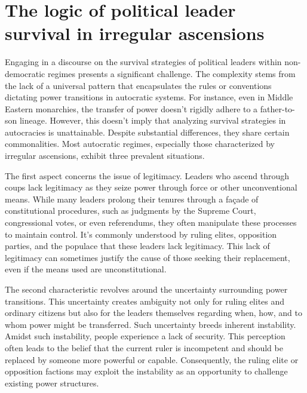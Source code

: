 \documentclass[
  12pt,
  a4paper,
  12pt]{article}
\begin{document}
\hypertarget{the-logic-of-political-leader-survival-in-irregular-ascensions}{%
\section{The logic of political leader survival in irregular
ascensions}\label{the-logic-of-political-leader-survival-in-irregular-ascensions}}

Engaging in a discourse on the survival strategies of political leaders
within non-democratic regimes presents a significant challenge. The
complexity stems from the lack of a universal pattern that encapsulates
the rules or conventions dictating power transitions in autocratic
systems. For instance, even in Middle Eastern monarchies, the transfer
of power doesn't rigidly adhere to a father-to-son lineage. However,
this doesn't imply that analyzing survival strategies in autocracies is
unattainable. Despite substantial differences, they share certain
commonalities. Most autocratic regimes, especially those characterized
by irregular ascensions, exhibit three prevalent situations.

The first aspect concerns the issue of legitimacy. Leaders who ascend
through coups lack legitimacy as they seize power through force or other
unconventional means. While many leaders prolong their tenures through a
façade of constitutional procedures, such as judgments by the Supreme
Court, congressional votes, or even referendums, they often manipulate
these processes to maintain control. It's commonly understood by ruling
elites, opposition parties, and the populace that these leaders lack
legitimacy. This lack of legitimacy can sometimes justify the cause of
those seeking their replacement, even if the means used are
unconstitutional.

The second characteristic revolves around the uncertainty surrounding
power transitions. This uncertainty creates ambiguity not only for
ruling elites and ordinary citizens but also for the leaders themselves
regarding when, how, and to whom power might be transferred. Such
uncertainty breeds inherent instability. Amidst such instability, people
experience a lack of security. This perception often leads to the belief
that the current ruler is incompetent and should be replaced by someone
more powerful or capable. Consequently, the ruling elite or opposition
factions may exploit the instability as an opportunity to challenge
existing power structures.
\end{document}
